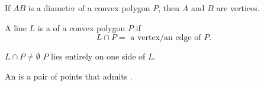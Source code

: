 \begin{frame}{}
  \begin{center}
    {}
  \end{center}

  \vspace{0.30cm}
\end{frame}

\begin{frame}{}
  \begin{theorem}[DH 4-8]
    If $AB$ is a diameter of a convex polygon $P$, then $A$ and $B$ are vertices.
  \end{theorem}

  \begin{center}
    
  \end{center}

\end{frame}

\begin{frame}{}
  \begin{definition}
    A line $L$ is a  of a convex polygon $P$ if
    \[
      L \cap P = \text{ a vertex/an edge of } P.
    \]
  \end{definition}


  \pause
  \vspace{0.20cm}
  \begin{center}
    {$L \cap P \neq \emptyset$ \qquad $P$ lies entirely on one side of $L$.}
  \end{center}
\end{frame}

\begin{frame}{}
  \begin{definition}[Antipodal]
    An  is a pair of points that admits .
  \end{definition}


  \pause
  \begin{center}
    {}
  \end{center}
\end{frame}

